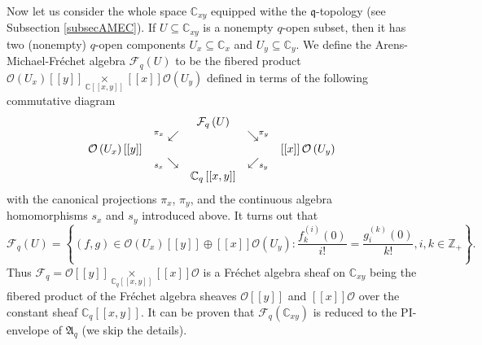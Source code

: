 \documentclass[12pt,reqno]{amsart}%
\theoremstyle{plain}
\numberwithin{theorem}{section} \numberwithin{equation}{section}
\numberwithin{lemma}{section}
\numberwithin{remark}{section}
\numberwithin{example}{section}
\numberwithin{proposition}{section}
\numberwithin{definition}{section}
\numberwithin{corollary}{section}
\begin{document}
Now let us consider the whole space $\mathbb{C}_{xy}$ equipped withe the
$\mathfrak{q}$-topology (see Subsection \ref{subsecAMEC}). If $U\subseteq
\mathbb{C}_{xy}$ is a nonempty $q$-open subset, then it has two (nonempty)
$q$-open components $U_{x}\subseteq\mathbb{C}_{x}$ and $U_{y}\subseteq
\mathbb{C}_{y}$. We define the Arens-Michael-Fr\'{e}chet algebra
$\mathcal{F}_{q}\left(  U\right)  $ to be the fibered product $\mathcal{O}%
\left(  U_{x}\right)  \left[  \left[  y\right]  \right]  \underset{\mathbb{C}%
\left[  \left[  x,y\right]  \right]  }{\times}\left[  \left[  x\right]
\right]  \mathcal{O}\left(  U_{y}\right)  $ defined in terms of the following
commutative diagram%
\[%
\begin{array}
[c]{ccccc}
&  & \mathcal{F}_{q}\left(  U\right)  &  & \\
& ^{\pi_{x}}\swarrow &  & \searrow^{\pi_{y}} & \\
\mathcal{O}\left(  U_{x}\right)  \left[  \left[  y\right]  \right]  &  &  &  &
\left[  \left[  x\right]  \right]  \mathcal{O}\left(  U_{y}\right) \\
& _{s_{x}}\searrow &  & \swarrow_{s_{y}} & \\
&  & \mathbb{C}_{q}\left[  \left[  x,y\right]  \right]  &  &
\end{array}
\]
with the canonical projections $\pi_{x}$, $\pi_{y}$, and the continuous
algebra homomorphisms $s_{x}$ and $s_{y}$ introduced above. It turns out that
\begin{equation}
\mathcal{F}_{q}\left(  U\right)  =\left\{  \left(  f,g\right)  \in
\mathcal{O}\left(  U_{x}\right)  \left[  \left[  y\right]  \right]
\oplus\left[  \left[  x\right]  \right]  \mathcal{O}\left(  U_{y}\right)
:\dfrac{f_{k}^{\left(  i\right)  }\left(  0\right)  }{i!}=\dfrac
{g_{i}^{\left(  k\right)  }\left(  0\right)  }{k!},i,k\in\mathbb{Z}%
_{+}\right\}  . \label{FqF}%
\end{equation}
Thus $\mathcal{F}_{q}=\mathcal{O}\left[  \left[  y\right]  \right]
\underset{\mathbb{C}_{q}\left[  \left[  x,y\right]  \right]  }{\times}\left[
\left[  x\right]  \right]  \mathcal{O}$ is a Fr\'{e}chet algebra sheaf on
$\mathbb{C}_{xy}$ being the fibered product of the Fr\'{e}chet algebra sheaves
$\mathcal{O}\left[  \left[  y\right]  \right]  $ and $\left[  \left[
x\right]  \right]  \mathcal{O}$ over the constant sheaf $\mathbb{C}_{q}\left[
\left[  x,y\right]  \right]  $. It can be proven that $\mathcal{F}_{q}\left(
\mathbb{C}_{xy}\right)  $ is reduced to the PI-envelope of $\mathfrak{A}_{q}$
(we skip the details).
\end{document}
